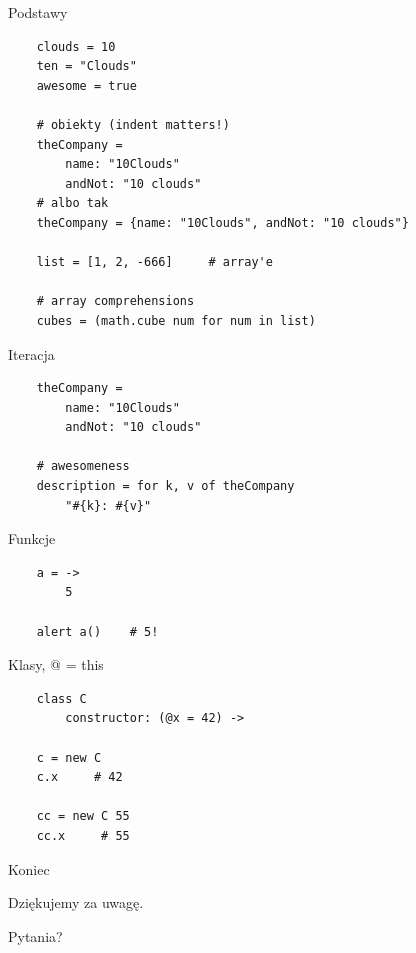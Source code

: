 \documentclass[xcolor=dvipsnames]{beamer}
\begin{document}
\begin{frame}[fragile]{Podstawy}
    
    \begin{verbatim}
    clouds = 10
    ten = "Clouds"
    awesome = true

    # obiekty (indent matters!)
    theCompany =
        name: "10Clouds"
        andNot: "10 clouds"
    # albo tak
    theCompany = {name: "10Clouds", andNot: "10 clouds"}

    list = [1, 2, -666]     # array'e

    # array comprehensions
    cubes = (math.cube num for num in list)

    \end{verbatim}
\end{frame}

\begin{frame}[fragile]{Iteracja}
    
    \begin{verbatim}
    theCompany =
        name: "10Clouds"
        andNot: "10 clouds"

    # awesomeness
    description = for k, v of theCompany
        "#{k}: #{v}"

    \end{verbatim}
\end{frame}

\begin{frame}[fragile]{Funkcje}
    
    \begin{verbatim}
    a = ->
        5

    alert a()    # 5!
    \end{verbatim}
\end{frame}

\begin{frame}[fragile]{Klasy, @ = this}
    
    \begin{verbatim}
    class C
        constructor: (@x = 42) ->

    c = new C
    c.x     # 42

    cc = new C 55
    cc.x     # 55

    \end{verbatim}
\end{frame}

\begin{frame}[fragile]{Koniec}
    \begin{center}
        Dziękujemy za uwagę.
        
        \vspace{2 cm}
        \pause
        Pytania?
    \end{center}
\end{frame}
\end{document}
